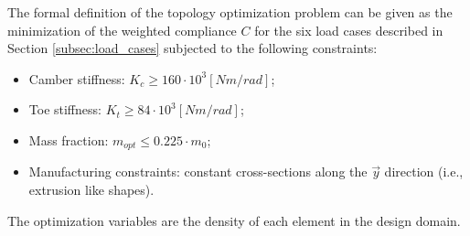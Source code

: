 The formal definition of the topology optimization problem can be given as the minimization of the weighted compliance $C$ for the six load cases described in Section \ref{subsec:load_cases} subjected to the following constraints:

\begin{itemize}
    \item Camber stiffness: $K_c \geq 160\cdot10^3 [Nm/rad]$;
    \item Toe stiffness: $K_t \geq 84\cdot10^3 [Nm/rad]$;
    \item Mass fraction: $m_{opt} \leq 0.225 \cdot m_0$;
    \item Manufacturing constraints: constant cross-sections along the $\vec{y}$ direction (i.e., extrusion like shapes).
\end{itemize}

The optimization variables are the density of each element in the design domain.
